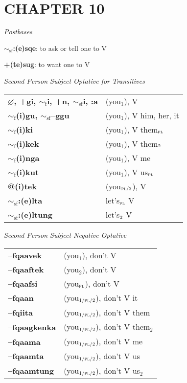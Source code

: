 \documentclass{article}
\begin{document}
\section*{CHAPTER 10}

\textit{Postbases}
\begin{description}
\item \textbf{$\sim_\text{sf}$:(e)sqe}: to ask or tell one to V
\item \textbf{+(te)sug}: to want one to V
\end{description}

\bigskip

\textit{Second Person Subject Optative for Transitives}

\begin{tabular}{ l l }
\textbf{$\varnothing$, +gi, $\sim_\text{f}$i, +n, $\sim_\text{sf}$i, :a} & (you$_1$), V \\
\textbf{$\sim_\text{f}$(i)gu, $\sim_\text{sf}$--ggu} & (you$_1$), V him, her, it \\
\textbf{$\sim_\text{f}$(i)ki} & (you$_1$), V them$_\text{\textsc{pl}}$ \\
\textbf{$\sim_\text{f}$(i)kek} & (you$_1$), V them$_\text{\textsc{2}}$ \\
\textbf{$\sim_\text{f}$(i)nga} & (you$_1$), V me \\
\textbf{$\sim_\text{f}$(i)kut} & (you$_1$), V us$_\text{\textsc{pl}}$ \\
\textbf{@(i)tek} & (you$_\text{\textsc{pl/2}}$), V \\
\textbf{$\sim_\text{sf}$:(e)lta} & let's$_\text{\textsc{pl}}$ V \\
\textbf{$\sim_\text{sf}$:(e)ltung} & let's$_\text{\textsc{2}}$ V
\end{tabular}

\bigskip

\textit{Second Person Subject Negative Optative}

\begin{tabular}{ l l }
\textbf{--fqaavek} & (you$_1$), don't V \\
\textbf{--fqaaftek} & (you$_2$), don't V \\
\textbf{--fqaafsi} & (you$_\text{\textsc{pl}}$), don't V \\
\textbf{--fqaan} & (you$_\text{\textsc{1/pl/2}}$), don't V it \\
\textbf{--fqiita} & (you$_\text{\textsc{1/pl/2}}$), don't V them \\
\textbf{--fqaagkenka} & (you$_\text{\textsc{1/pl/2}}$), don't V them$_2$ \\
\textbf{--fqaama} & (you$_\text{\textsc{1/pl/2}}$), don't V me \\
\textbf{--fqaamta} & (you$_\text{\textsc{1/pl/2}}$), don't V us \\
\textbf{--fqaamtung} & (you$_\text{\textsc{1/pl/2}}$), don't V us$_2$
\end{tabular}
\end{document}

